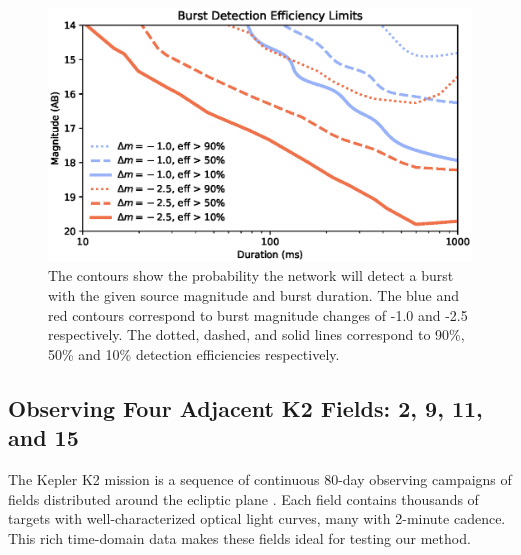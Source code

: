 \documentclass[11pt]{article}
\begin{document}
\begin{figure}[htb]
\center
\includegraphics[width=\columnwidth]{contour.eps}
\caption{The contours show the probability the network will detect a burst with the given source magnitude and burst duration. The blue and red contours correspond to burst magnitude changes of -1.0 and -2.5 respectively. The dotted, dashed, and solid lines correspond to 90\%, 50\% and 10\% detection efficiencies respectively.}
\label{fig:3}
\end{figure}


\clearpage

%

%

\expdesign
\subsection*{Observing Four Adjacent K2 Fields: 2, 9, 11, and 15}

The Kepler K2 mission is a sequence of continuous 80-day observing campaigns of fields distributed around the ecliptic plane \citep{2014PASP..126..398H}. Each field contains thousands of targets with well-characterized optical light curves, many with 2-minute cadence. This rich time-domain data makes these fields ideal for testing our method.
\end{document}
